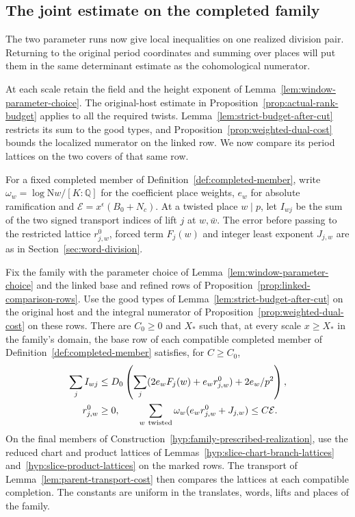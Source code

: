 \subsection{The joint estimate on the completed family}
\label{subsec:joint-family-estimate}

The two parameter runs now give local inequalities on one realized division pair. Returning to the original period coordinates and summing over places will put them in the same determinant estimate as the cohomological numerator.

At each scale retain the field and the height exponent of
Lemma~\ref{lem:window-parameter-choice}. The original-host estimate in
Proposition~\ref{prop:actual-rank-budget} applies to all the required
twists. Lemma~\ref{lem:strict-budget-after-cut} restricts its sum to
the good types, and Proposition~\ref{prop:weighted-dual-cost} bounds
the localized numerator on the linked row. We now compare its period
lattices on the two covers of that same row.
\begin{definition}\label{def:joint-pair-indices}
For a fixed completed member of Definition~\ref{def:completed-member}, write \(\omega_w=\log\mathrm Nw/[K:\mathbb Q]\) for the coefficient
place weights, \(e_w\) for absolute ramification and
\(\mathcal E=x^\epsilon(B_0+N_c)\).
At a twisted place \(w\mid p\), let \(I_{wj}\) be the sum of the
two signed transport indices of lift \(j\) at \(w,\bar w\). The
error before passing to the restricted lattice \(r^0_{j,w}\), forced term \(F_j(w)\) and integer
least exponent \(J_{j,w}\) are as in Section~\ref{sec:word-division}.
\end{definition}

\begin{lemma}\label{lem:joint-family}
Fix the family with the parameter choice of
Lemma~\ref{lem:window-parameter-choice} and the linked base
and refined rows of Proposition~\ref{prop:linked-comparison-rows}.
Use the good types of Lemma~\ref{lem:strict-budget-after-cut} on the
original host and the integral numerator of
Proposition~\ref{prop:weighted-dual-cost} on these rows. There are \(C_0\ge0\) and \(X_*\) such that, at
every scale \(x\ge X_*\) in the family's domain, the base row of
each compatible completed member of Definition~\ref{def:completed-member}
satisfies, for \(C\ge C_0\),
\begin{align}
 \sum_j I_{wj}
 &\le D_0\left(\sum_j(2e_wF_j(w)+e_w r^0_{j,w})
                         +2e_w/p^2\right),\label{eq:joint-parent-local}\\
 r^0_{j,w}&\ge0,\qquad
 \sum_{w\ {\rm twisted}}\omega_w(e_w r^0_{j,w}+J_{j,w})
                \le C\mathcal E.\label{eq:joint-parent-global}
\end{align}
On the final members of Construction~\ref{hyp:family-prescribed-realization}, use the reduced chart and product lattices of Lemmas~\ref{hyp:slice-chart-branch-lattices} and~\ref{hyp:slice-product-lattices} on the marked rows. The transport of Lemma~\ref{lem:parent-transport-cost} then compares the lattices at each compatible completion.
The constants are uniform in the translates, words, lifts and
places of the family.
\end{lemma}

